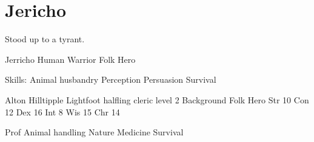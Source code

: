 \documentclass[a4paper]{dnd5}
\begin{document}
\pagestyle{empty}

\newtoggle{DM}
\toggletrue{DM}

\section*{Jericho}

Stood up to a tyrant.  


Jerricho
Human Warrior 
Folk Hero

Skills:
   Animal husbandry
   Perception
   Persuasion
   Survival




Alton Hilltipple
Lightfoot halfling cleric level 2
Background Folk Hero
Str 10
Con 12
Dex 16
Int 8
Wis 15
Chr 14

Prof
Animal handling 
Nature 
Medicine
Survival
\end{document}
